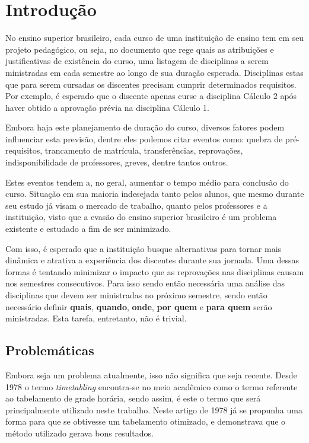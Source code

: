 \chapter{Introdução} \label{chap:introducao} %

No ensino superior brasileiro, cada curso de uma instituição de ensino tem em seu projeto pedagógico, ou seja, no documento que rege quais as atribuições e justificativas de existência do curso, uma listagem de disciplinas a serem ministradas em cada semestre ao longo de sua duração esperada. Disciplinas estas que para serem cursadas os discentes precisam cumprir determinados requisitos. Por exemplo, é esperado que o discente apenas curse a disciplina Cálculo 2 após haver obtido a aprovação prévia na disciplina Cálculo 1.

Embora haja este planejamento de duração do curso, diversos fatores podem influenciar esta previsão, dentre eles podemos citar eventos como: quebra de pré-requisitos, trancamento de matrícula, transferências, reprovações, indisponibilidade de professores, greves, dentre tantos outros.

Estes eventos tendem a, no geral, aumentar o tempo médio para conclusão do curso. Situação em sua maioria indesejada tanto pelos alunos, que mesmo durante seu estudo já visam o mercado de trabalho, quanto pelos professores e a instituição, visto que a evasão do ensino superior brasileiro é um problema existente e estudado a fim de ser minimizado.

Com isso, é esperado que a instituição busque alternativas para tornar mais dinâmica e atrativa a experiência dos discentes durante sua jornada. Uma dessas formas é tentando minimizar o impacto que as reprovações nas disciplinas causam nos semestres consecutivos. Para isso sendo então necessária uma análise das disciplinas que devem ser ministradas no próximo semestre, sendo então necessário definir \textbf{quais}, \textbf{quando}, \textbf{onde}, \textbf{por quem} e \textbf{para quem} serão ministradas. Esta tarefa, entretanto, não é trivial.

\section{Problemáticas} \label{sec:Problemáticas} %

Embora seja um problema atualmente, isso não significa que seja recente. Desde 1978 \cite{BARHAM1978} o termo \textit{timetabling} encontra-se no meio acadêmico como o termo referente ao tabelamento de grade horária, sendo assim, é este o termo que será principalmente utilizado neste trabalho. Neste artigo de 1978 já se propunha uma forma para que se obtivesse um tabelamento otimizado, e demonstrava que o método utilizado gerava bons resultados.

